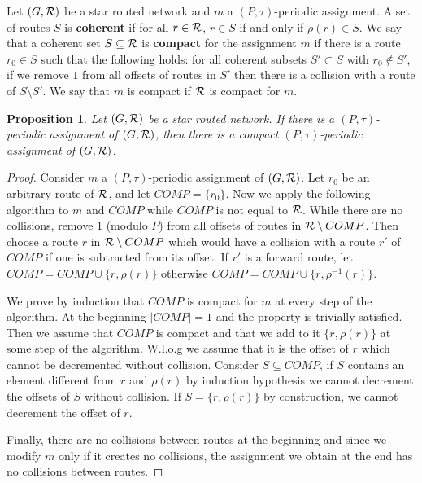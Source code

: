\documentclass[a4paper,10pt]{article}
\newtheorem{proposition}{Proposition}
\begin{document}
Let $(G, {\cal R})$ be a star routed network and $m$ a $(P,\tau)$-periodic assignment.
A set of routes $S$ is \textbf{coherent} if for all $r \in {\cal R}$, $r \in S$ if and only if $\rho(r) \in S$. We say that a coherent set $S \subseteq {\cal R}$ is \textbf{compact} for the assignment $m$ if there is a route $r_0 \in S$ such that the following holds:  
for all coherent subsets $S'\subset S$ with $r_0 \notin S'$, if we remove $1$ from all offsets of routes in $S'$ then there is a collision with a route of $S \setminus S'$. We say that $m$ is compact if ${\cal R}$ is compact for $m$. 
% 
% 

\begin{proposition}
Let $(G, {\cal R})$ be a star routed network. If there is a $(P,\tau)$-periodic assignment of $(G, {\cal R})$, then there is a compact $(P,\tau)$-periodic assignment of $(G, {\cal R})$.
\end{proposition}
\begin{proof}
Consider $m$ a $(P,\tau)$-periodic assignment of $(G, {\cal R})$.
Let $r_0$ be an arbitrary route of ${\cal R}$,  and let $COMP = \{r_0\}$. Now we apply the following algorithm to $m$ and $COMP$ while $COMP$ is not equal to ${\cal R}$.
While there are no collisions, remove $1$ (modulo $P$) from all offsets of routes in ${\cal R} \setminus COMP$. Then choose a route $r$ in ${\cal R} \setminus COMP$ which would have a collision with a route $r'$ of $COMP$ if one is subtracted from its offset. If $r'$ is a forward route, let $COMP = COMP \cup \{r, \rho(r)\}$ otherwise  $COMP = COMP \cup \{r, \rho^{-1}(r)\}$. 

We prove by induction that $COMP$ is compact for $m$ at every step of the algorithm.
At the beginning $|COMP| = 1$ and the property is trivially satisfied. Then we assume that 
$COMP$ is compact and that we add to it $\{r, \rho(r)\}$ at some step of the algorithm. W.l.o.g we assume that it is the offset of $r$ which cannot be decremented without collision. Consider $S \subseteq   COMP$, if $S$ contains an element different from $r$ and $\rho(r)$ by induction hypothesis we cannot decrement the offsets of $S$ without collision. If $S =\{r, \rho(r)\}$
by construction, we cannot decrement the offset of $r$. 

Finally, there are no collisions between routes at the beginning and since we modify $m$ only if it creates no collisions, the assignment we obtain at the end has no collisions between routes.
\end{proof}
\end{document}
